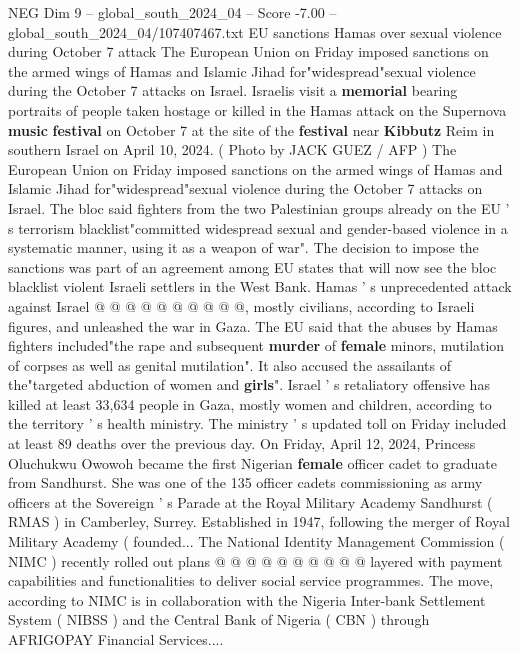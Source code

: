 \begin{textsample}{NEG Dim 9 – global\_south\_2024\_04 – Score -7.00 – global\_south\_2024\_04/107407467.txt}  \label{ex:f9_neg_323}
EU sanctions Hamas over sexual violence during October 7 attack The European Union on Friday imposed sanctions on the armed wings of Hamas and Islamic Jihad for"widespread"sexual violence during the October 7 attacks on Israel.
Israelis visit a \textbf{memorial} bearing portraits of people taken hostage or killed in the Hamas attack on the Supernova \textbf{music} \textbf{festival} on October 7 at the site of the \textbf{festival} near \textbf{Kibbutz} Reim in southern Israel on April 10, 2024. ( Photo by JACK GUEZ / AFP ) The European Union on Friday imposed sanctions on the armed wings of Hamas and Islamic Jihad for"widespread"sexual violence during the October 7 attacks on Israel.
The bloc said fighters from the two Palestinian groups already on the EU ' s terrorism blacklist"committed widespread sexual and gender-based violence in a systematic manner, using it as a weapon of war".
The decision to impose the sanctions was part of an agreement among EU states that will now see the bloc blacklist violent Israeli settlers in the West Bank.
Hamas ' s unprecedented attack against Israel @ @ @ @ @ @ @ @ @ @, mostly civilians, according to Israeli figures, and unleashed the war in Gaza.
The EU said that the abuses by Hamas fighters included"the rape and subsequent \textbf{murder} of \textbf{female} minors, mutilation of corpses as well as genital mutilation".
It also accused the assailants of the"targeted abduction of women and \textbf{girls}".
Israel ' s retaliatory offensive has killed at least 33,634 people in Gaza, mostly women and children, according to the territory ' s health ministry.
The ministry ' s updated toll on Friday included at least 89 deaths over the previous day.
On Friday, April 12, 2024, Princess Oluchukwu Owowoh became the first Nigerian \textbf{female} officer cadet to graduate from Sandhurst.
She was one of the 135 officer cadets commissioning as army officers at the Sovereign ' s Parade at the Royal Military Academy Sandhurst ( RMAS ) in Camberley, Surrey.
Established in 1947, following the merger of Royal Military Academy ( founded...
The National Identity Management Commission ( NIMC ) recently rolled out plans @ @ @ @ @ @ @ @ @ @ layered with payment capabilities and functionalities to deliver social service programmes.
The move, according to NIMC is in collaboration with the Nigeria Inter-bank Settlement System ( NIBSS ) and the Central Bank of Nigeria ( CBN ) through AFRIGOPAY Financial Services....

\end{textsample}
